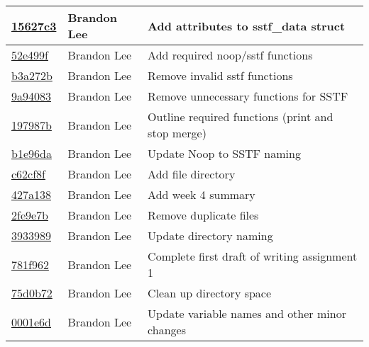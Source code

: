 \documentclass[letterpaper,10pt,titlepage]{article}
\begin{document}
\begin{tabular}{l l l}
\href{https://github.com/brandonlee503/Operating-Systems-II/commit/15627c3ad0074838d32a689c5df0b55f1832d91f}{15627c3} & Brandon Lee & Add attributes to sstf_data struct\\\hline
\href{https://github.com/brandonlee503/Operating-Systems-II/commit/52e499f46f88a6e1104e8a3d8f2c759c525f6d20}{52e499f} & Brandon Lee & Add required noop/sstf functions\\\hline
\href{https://github.com/brandonlee503/Operating-Systems-II/commit/b3a272b869b7a4a75f7fdd8f8f1e3e0938eb8f29}{b3a272b} & Brandon Lee & Remove invalid sstf functions\\\hline
\href{https://github.com/brandonlee503/Operating-Systems-II/commit/9a940838fa9794ced7059dca532962cb5062f580}{9a94083} & Brandon Lee & Remove unnecessary functions for SSTF\\\hline
\href{https://github.com/brandonlee503/Operating-Systems-II/commit/197987b5a31da6c5b1f2dda8918ff01f49f8eae7}{197987b} & Brandon Lee & Outline required functions (print and stop merge)\\\hline
\href{https://github.com/brandonlee503/Operating-Systems-II/commit/b1e96daf6ebc0b733520c55a371824b947841084}{b1e96da} & Brandon Lee & Update Noop to SSTF naming\\\hline
\href{https://github.com/brandonlee503/Operating-Systems-II/commit/c62cf8fd85523293a8979a0f33f3fcf129dfc06c}{c62cf8f} & Brandon Lee & Add file directory\\\hline
\href{https://github.com/brandonlee503/Operating-Systems-II/commit/427a138ecba3b4d3b2076e086fc400a453f1e6b7}{427a138} & Brandon Lee & Add week 4 summary\\\hline
\href{https://github.com/brandonlee503/Operating-Systems-II/commit/2fe9e7be0033bb189532aa1b6ed60368961a9eac}{2fe9e7b} & Brandon Lee & Remove duplicate files\\\hline
\href{https://github.com/brandonlee503/Operating-Systems-II/commit/3933989f88d150178371f5a51df089809001deb3}{3933989} & Brandon Lee & Update directory naming\\\hline
\href{https://github.com/brandonlee503/Operating-Systems-II/commit/781f962c9334215974239d6444f5895159bad253}{781f962} & Brandon Lee & Complete first draft of writing assignment 1\\\hline
\href{https://github.com/brandonlee503/Operating-Systems-II/commit/75d0b72e1b4b91fc2057d10d87a03a75eb67383d}{75d0b72} & Brandon Lee & Clean up directory space\\\hline
\href{https://github.com/brandonlee503/Operating-Systems-II/commit/0001e6daaec0b0f958ba177dcd431b63eae1c593}{0001e6d} & Brandon Lee & Update variable names and other minor changes\\\hline

\end{tabular}
\end{document}
